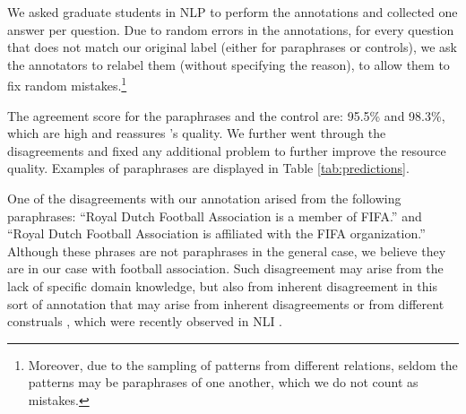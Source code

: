 We asked graduate students in NLP to perform the annotations and collected one answer per question.
Due to random errors in the annotations, for every question that does not match our original label (either for paraphrases or controls), we ask the annotators to relabel them (without specifying the reason), to allow them to fix random mistakes.\footnote{Moreover, due to the sampling of patterns from different relations, seldom the patterns may be paraphrases of one another, which we do not count as mistakes.}

The agreement score for the paraphrases and the control are: 95.5\% and 98.3\%, which are high and reassures \resource's quality.
We further went through the disagreements  %
and fixed any additional problem %
to further improve the resource quality.
Examples of paraphrases are displayed in Table \ref{tab:predictions}. 
% 

One of the disagreements with our annotation arised from the following paraphrases: ``Royal Dutch Football Association is a member of FIFA.'' and ``Royal Dutch Football Association is affiliated with the FIFA organization.''
Although these phrases are not paraphrases in the general case, we believe they are in our case with football association. Such disagreement may arise from the lack of specific domain knowledge, but also from inherent disagreement in this sort of annotation that may arise from inherent disagreements \cite{pavlick2019inherent} or from different construals \cite{trott2020re}, which were recently observed in NLI \cite{elazar2020extraordinary}.